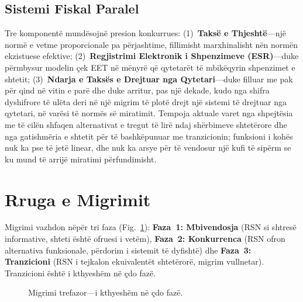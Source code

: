 \documentclass[11pt,a4paper,twocolumn]{article}
\begin{document}
\subsection{Sistemi Fiskal Paralel}

Tre komponentë mundësojnë presion konkurrues: (1)~\textbf{Taksë e Thjeshtë}---një normë e vetme proporcionale pa përjashtime, fillimisht marxhinalisht nën normën ekzistuese efektive; (2)~\textbf{Regjistrimi Elektronik i Shpenzimeve (ESR)}---duke përmbysur modelin çek EET në mënyrë që qytetarët të mbikëqyrin shpenzimet e shtetit; (3)~\textbf{Ndarja e Taksës e Drejtuar nga Qytetari}---duke filluar me pak për qind në vitin e parë dhe duke arritur, pas një dekade, kudo nga shifra dyshifrore të ulëta deri në një migrim të plotë drejt një sistemi të drejtuar nga qytetari, në varësi të normës së miratimit. Tempoja aktuale varet nga shpejtësia me të cilën shfaqen alternativat e tregut të lirë ndaj shërbimeve shtetërore dhe nga gatishmëria e shtetit për të bashkëpunuar me tranzicionin; funksioni i kohës nuk ka pse të jetë linear, dhe nuk ka arsye për të vendosur një kufi të sipërm se ku mund të arrijë miratimi përfundimisht.

\section{Rruga e Migrimit}

Migrimi vazhdon nëpër tri faza (Fig.~\ref{fig:migration}): \textbf{Faza~1: Mbivendosja} (RSN si shtresë informative, shteti është ofruesi i vetëm), \textbf{Faza~2: Konkurrenca} (RSN ofron alternativa funksionale, përdorim i sistemit të dyfishtë) dhe \textbf{Faza~3: Tranzicioni} (RSN i tejkalon ekuivalentët shtetërorë, migrim vullnetar). Tranzicioni është i kthyeshëm në çdo fazë.

\begin{figure}[ht]
\centering
{}
\caption{Migrimi trefazor---i kthyeshëm në çdo fazë.}
\label{fig:migration}
\end{figure}
\end{document}
